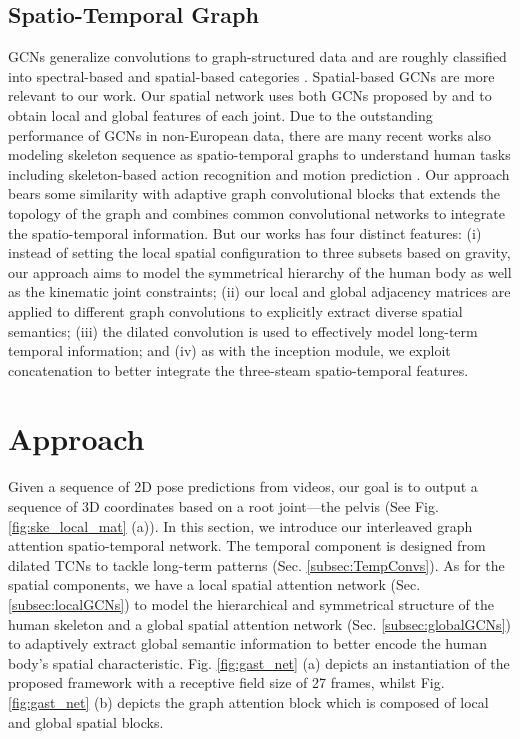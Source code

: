 \documentclass[letterpaper, 10 pt, conference, twoside]{ieeeconf}
\begin{document}
\subsection{Spatio-Temporal Graph}
GCNs generalize convolutions to graph-structured data and are roughly classified into  spectral-based and spatial-based categories \cite{kipf2016semi,zhao2019semantic,velivckovic2017graph}. Spatial-based GCNs are more relevant to our work. Our spatial network uses both GCNs proposed by \cite{zhao2019semantic} and \cite{velivckovic2017graph} to obtain local and global features of each joint. Due to the outstanding performance of GCNs in non-European data, there are many recent works also modeling skeleton sequence as spatio-temporal graphs to understand human tasks including skeleton-based action recognition \cite{shi2019two,yan2018spatial} and motion prediction \cite{li2020dynamic}. Our approach bears some similarity with adaptive graph convolutional blocks \cite{shi2019two} that extends the topology of the graph and combines common convolutional networks to integrate the spatio-temporal information. But our works has four distinct features: (i) instead of setting the local spatial configuration to three subsets based on gravity, our approach aims to model the symmetrical hierarchy of the human body as well as the kinematic joint constraints; (ii) our local and global adjacency matrices are applied to different graph convolutions to explicitly extract diverse spatial semantics; (iii) the dilated convolution is used to effectively model long-term temporal information; and (iv) as with the inception module, we exploit concatenation to better integrate the three-steam spatio-temporal features.


\section{Approach}\label{sec:GAST}
Given a sequence of 2D pose predictions from videos, our goal is to output a sequence of 3D coordinates based on a root joint---the pelvis (See Fig. \ref{fig:ske_local_mat} (a)). In this section, we introduce our interleaved graph attention spatio-temporal network. The temporal component is designed from dilated TCNs to tackle long-term patterns (Sec. \ref{subsec:TempConvs}). As for the spatial components, we have a local spatial attention network (Sec. \ref{subsec:localGCNs}) to model the hierarchical and symmetrical structure of the human skeleton and a global spatial attention network (Sec. \ref{subsec:globalGCNs}) to adaptively extract global semantic information to better encode the human body's spatial characteristic. 
Fig. \ref{fig:gast_net} (a) depicts an instantiation of the proposed framework with a receptive field size of 27 frames, whilst Fig. \ref{fig:gast_net} (b) depicts the graph attention block which is composed of local and global spatial blocks. 
\end{document}
